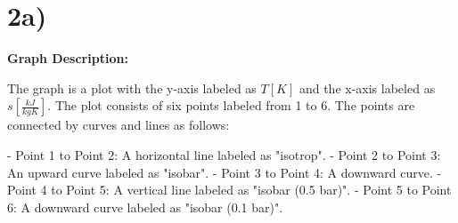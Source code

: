 

\section*{2a)}

\begin{center}
\textbf{Graph Description:}
\end{center}

The graph is a plot with the y-axis labeled as \( T \left[ K \right] \) and the x-axis labeled as \( s \left[ \frac{kJ}{kgK} \right] \). The plot consists of six points labeled from 1 to 6. The points are connected by curves and lines as follows:

- Point 1 to Point 2: A horizontal line labeled as "isotrop".
- Point 2 to Point 3: An upward curve labeled as "isobar".
- Point 3 to Point 4: A downward curve.
- Point 4 to Point 5: A vertical line labeled as "isobar (0.5 bar)".
- Point 5 to Point 6: A downward curve labeled as "isobar (0.1 bar)".